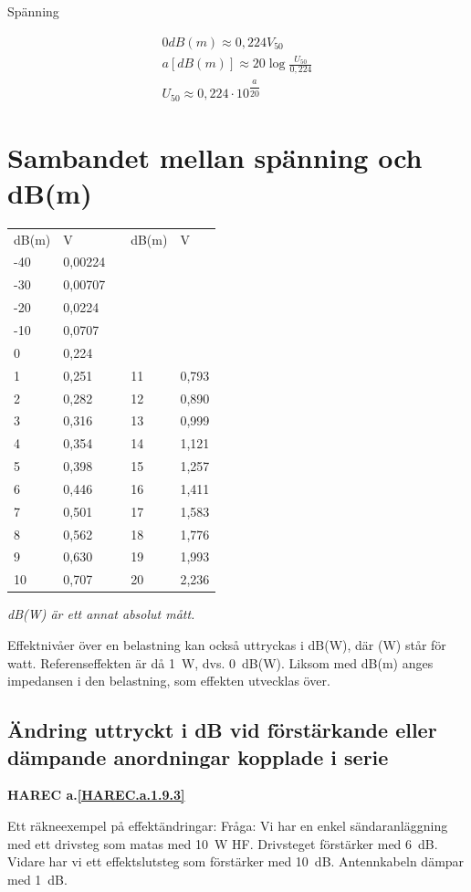 Spänning

\begin{gather*}
	0 dB(m) \approx 0,224 V_{50} \\
	a [dB(m)] \approx 20 \log\frac{U_{50}}{0,224} \\
	U_{50} \approx 0,224 \cdot 10^{\dfrac{a}{20}}
\end{gather*}

\section[Sambandet spänning och dB(m)]{Sambandet mellan spänning och dB(m)}
\begin{tabular}{l|lp{1cm}l|l}
	dB(m) & V & & dB(m) & V \\
	\cline{1-2} \cline{4-5}
	-40 & 0,00224 & & & \\
	-30 & 0,00707 & & & \\
	-20 & 0,0224  & & & \\
	-10 & 0,0707  & & & \\
	0   & 0,224   & & & \\
	1   & 0,251   & & 11 & 0,793 \\
	2   & 0,282   & & 12 & 0,890 \\
	3   & 0,316   & & 13 & 0,999 \\
	4   & 0,354   & & 14 & 1,121 \\
	5   & 0,398   & & 15 & 1,257 \\
	6   & 0,446   & & 16 & 1,411 \\
	7   & 0,501   & & 17 & 1,583 \\
	8   & 0,562   & & 18 & 1,776 \\
	9   & 0,630   & & 19 & 1,993 \\
	10  & 0,707   & & 20 & 2,236
\end{tabular}

\emph{dB(W) är ett annat absolut mått.}

Effektnivåer över en belastning kan också uttryckas i dB(W), där (W)
står för watt. Referenseffekten är då 1~W, dvs. 0~dB(W).
Liksom med dB(m) anges impedansen i den belastning, som effekten utvecklas över.

\subsection{Ändring uttryckt i dB vid förstärkande eller dämpande anordningar kopplade i serie}
\textbf{HAREC a.\ref{HAREC.a.1.9.3}\label{myHAREC.a.1.9.3}}

Ett räkneexempel på effektändringar:
Fråga:
Vi har en enkel sändaranläggning med ett drivsteg som matas med 10~W HF.
Drivsteget förstärker med 6~dB. Vidare har vi ett effektslutsteg som förstärker
med 10~dB. Antennkabeln dämpar med 1~dB.

